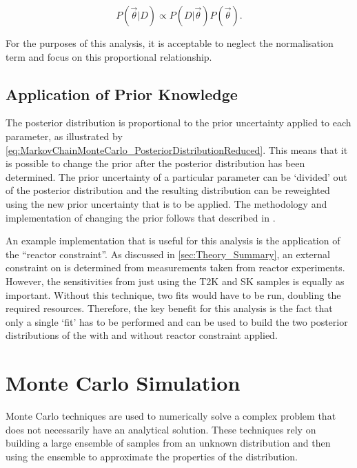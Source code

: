\begin{equation}
  \label{eq:MarkovChainMonteCarlo_PosteriorDistributionReduced}
  P(\vec{\theta}|D) \propto P(D|\vec{\theta}) P(\vec{\theta}).
\end{equation}

For the purposes of this analysis, it is acceptable to neglect the normalisation term and focus on this proportional relationship.

\subsection{Application of Prior Knowledge}
\label{sec:MarkovChainMonteCarlo_Priors}

The posterior distribution is proportional to the prior uncertainty applied to each parameter, as illustrated by \autoref{eq:MarkovChainMonteCarlo_PosteriorDistributionReduced}. This means that it is possible to change the prior after the posterior distribution has been determined. The prior uncertainty of a particular parameter can be `divided' out of the posterior distribution and the resulting distribution can be reweighted using the new prior uncertainty that is to be applied. The methodology and implementation of changing the prior follows that described in \cite{thesis_artur}. 

An example implementation that is useful for this analysis is the application of the ``reactor constraint''. As discussed in \autoref{sec:Theory_Summary}, an external constraint on  is determined from measurements taken from reactor experiments. However, the sensitivities from just using the T2K and SK samples is equally as important. Without this technique, two fits would have to be run, doubling the required resources. Therefore, the key benefit for this analysis is the fact that only a single `fit' has to be performed and can be used to build the two posterior distributions of the with and without reactor constraint applied.

\section{Monte Carlo Simulation}
\label{sec:MarkovChainMonteCarlo_MonteCarloSimulation}
Monte Carlo techniques are used to numerically solve a complex problem that does not necessarily have an analytical solution. These techniques rely on building a large ensemble of samples from an unknown distribution and then using the ensemble to approximate the properties of the distribution.

